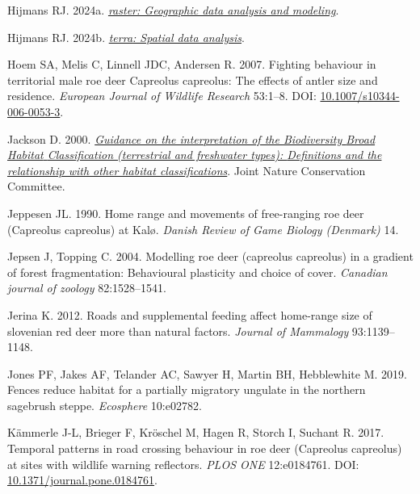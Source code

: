 \documentclass[10pt,a4paper]{article}
\newlength{\cslhangindent}
\newenvironment{CSLReferences}[2] %
 {\begin{list}{}{%
  \setlength{\itemindent}{0pt}
  \setlength{\leftmargin}{0pt}
  \setlength{\parsep}{0pt}
  \ifodd #1
   \setlength{\leftmargin}{\cslhangindent}
   \setlength{\itemindent}{-1\cslhangindent}
  \fi
  \setlength{\itemsep}{#2\baselineskip}}}
 {\end{list}}
\begin{document}
\begin{CSLReferences}{1}{0}
Hijmans RJ. 2024a. \emph{\href{https://CRAN.R-project.org/package=raster}{{raster}: Geographic data analysis and modeling}}.

Hijmans RJ. 2024b. \emph{\href{https://CRAN.R-project.org/package=terra}{{terra}: Spatial data analysis}}.

Hoem SA, Melis C, Linnell JDC, Andersen R. 2007. Fighting behaviour in territorial male roe deer {Capreolus} capreolus: The effects of antler size and residence. \emph{European Journal of Wildlife Research} 53:1--8. DOI: \href{https://doi.org/10.1007/s10344-006-0053-3}{10.1007/s10344-006-0053-3}.

Jackson D. 2000. \emph{\href{http://www.jncc.gov.uk/page-2433}{Guidance on the interpretation of the {Biodiversity} {Broad} {Habitat} {Classification} (terrestrial and freshwater types): {Definitions} and the relationship with other habitat classifications}}. Joint Nature Conservation Committee.

Jeppesen JL. 1990. Home range and movements of free-ranging roe deer ({Capreolus} capreolus) at {Kalø}. \emph{Danish Review of Game Biology (Denmark)} 14.

Jepsen J, Topping C. 2004. Modelling roe deer (capreolus capreolus) in a gradient of forest fragmentation: Behavioural plasticity and choice of cover. \emph{Canadian journal of zoology} 82:1528--1541.

Jerina K. 2012. Roads and supplemental feeding affect home-range size of slovenian red deer more than natural factors. \emph{Journal of Mammalogy} 93:1139--1148.

Jones PF, Jakes AF, Telander AC, Sawyer H, Martin BH, Hebblewhite M. 2019. Fences reduce habitat for a partially migratory ungulate in the northern sagebrush steppe. \emph{Ecosphere} 10:e02782.

Kämmerle J-L, Brieger F, Kröschel M, Hagen R, Storch I, Suchant R. 2017. Temporal patterns in road crossing behaviour in roe deer ({Capreolus} capreolus) at sites with wildlife warning reflectors. \emph{PLOS ONE} 12:e0184761. DOI: \href{https://doi.org/10.1371/journal.pone.0184761}{10.1371/journal.pone.0184761}.


\end{CSLReferences}
\end{document}
